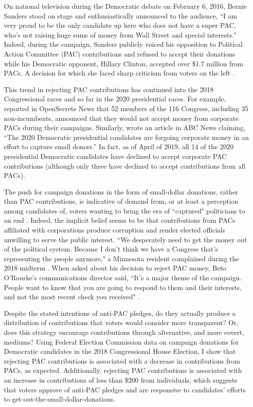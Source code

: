 \documentclass[12pt]{article}
\begin{document}
On national television during the Democratic debate on February 6, 2016, Bernie Sanders stood on stage and enthusiastically announced to the audience, ``I am very proud to be the only candidate up here who does not have a super PAC, who’s not raising huge sums of money from Wall Street and special interests." Indeed, during the campaign, Sanders publicly voiced his opposition to Political Action Committee (PAC) contributions and refused to accept their donations while his Democratic opponent, Hillary Clinton, accepted over \$1.7 million from PACs. A decision for which she faced sharp criticism from voters on the left \citep{seitz-wald2015, yeheelee2016, bump2016, harper2019}. 

This trend in rejecting PAC contributions has continued into the 2018 Congressional races and so far in the 2020 presidential races. For example, \citet{evers-hillstrom2018} reported in OpenSecrets News that 52 members of the 116 Congress, including 35 non-incumbents, announced that they would not accept money from corporate PACs during their campaigns. Similarly,  wrote an article in ABC News claiming, ``The 2020 Democratic presidential candidates are forgoing corporate money in an effort to capture small donors.'' In fact, as of April of 2019, all 14 of the 2020 presidential Democratic candidates have declined to accept corporate PAC contributions (although only three have declined to accept contributions from all PACs). 

The push for campaign donations in the form of small-dollar donations, rather than PAC contributions, is indicative of demand from, or at least a perception among candidates of, voters wanting to bring the era of ``captured" politicians to an end \citep{culberson2019}. Indeed, the implicit belief seems to be that contributions from PACs affiliated with corporations produce corruption and render elected officials unwilling to serve the public interest. ``We desperately need to get the money out of the political system. Because I don’t think we have a Congress that’s representing the people anymore," a Minnesota resident complained during the 2018 midterm \citep{stockman2018}. When asked about his decision to reject PAC money, Beto O’Rourke's communications director said, ``It’s a major theme of the campaign. People want to know that you are going to respond to them and their interests, and not the most recent check you received" \citep{stockman2018}. 

Despite the stated intentions of anti-PAC pledges, do they actually produce a distribution of contributions that voters would consider more transparent? Or, does this strategy encourage contributions through alternative, and more covert, mediums? Using Federal Election Commission data on campaign donations for Democratic candidates in the 2018 Congressional House Election, I show that rejecting PAC contributions is associated with a decrease in contributions from PACs, as expected. Additionally, rejecting PAC contributions is associated with an increase in contributions of less than \$200 from individuals, which suggests that voters approve of anti-PAC pledges and are responsive to candidates' efforts to get-out-the-small-dollar-donations.
\end{document}
